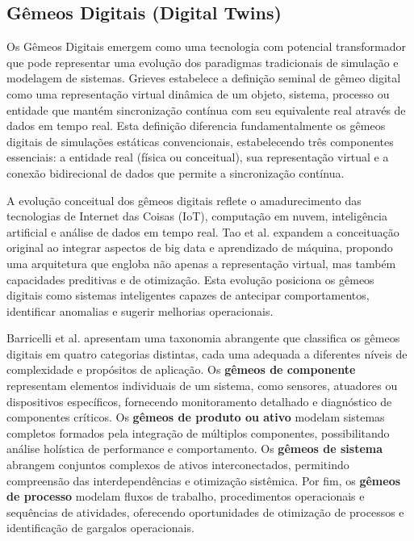 \documentclass[12pt,a4paper]{article}
\renewcommand{\cite}[1]{}
\begin{document}
\subsection{Gêmeos Digitais (Digital Twins)}

Os Gêmeos Digitais emergem como uma tecnologia com potencial transformador que
pode representar uma evolução dos paradigmas tradicionais de simulação e
modelagem de sistemas. Grieves \cite{grieves2014} estabelece a definição
seminal de gêmeo digital como uma representação virtual dinâmica de um objeto,
sistema, processo ou entidade que mantém sincronização contínua com seu
equivalente real através de dados em tempo real. Esta definição diferencia
fundamentalmente os gêmeos digitais de simulações estáticas convencionais,
estabelecendo três componentes essenciais: a entidade real (física ou
conceitual), sua representação virtual e a conexão bidirecional de dados que
permite a sincronização contínua.

A evolução conceitual dos gêmeos digitais reflete o amadurecimento das
tecnologias de Internet das Coisas (IoT), computação em nuvem, inteligência
artificial e análise de dados em tempo real. Tao et al. \cite{tao2018} expandem
a conceituação original ao integrar aspectos de big data e aprendizado de
máquina, propondo uma arquitetura que engloba não apenas a representação
virtual, mas também capacidades preditivas e de otimização. Esta evolução
posiciona os gêmeos digitais como sistemas inteligentes capazes de antecipar
comportamentos, identificar anomalias e sugerir melhorias operacionais.

Barricelli et al. \cite{barricelli2019} apresentam uma taxonomia abrangente que
classifica os gêmeos digitais em quatro categorias distintas, cada uma adequada
a diferentes níveis de complexidade e propósitos de aplicação. Os
\textbf{gêmeos de componente} representam elementos individuais de um sistema,
como sensores, atuadores ou dispositivos específicos, fornecendo monitoramento
detalhado e diagnóstico de componentes críticos. Os \textbf{gêmeos de produto
  ou ativo} modelam sistemas completos formados pela integração de múltiplos
componentes, possibilitando análise holística de performance e comportamento.
Os \textbf{gêmeos de sistema} abrangem conjuntos complexos de ativos
interconectados, permitindo compreensão das interdependências e otimização
sistêmica. Por fim, os \textbf{gêmeos de processo} modelam fluxos de trabalho,
procedimentos operacionais e sequências de atividades, oferecendo oportunidades
de otimização de processos e identificação de gargalos operacionais.
\end{document}
